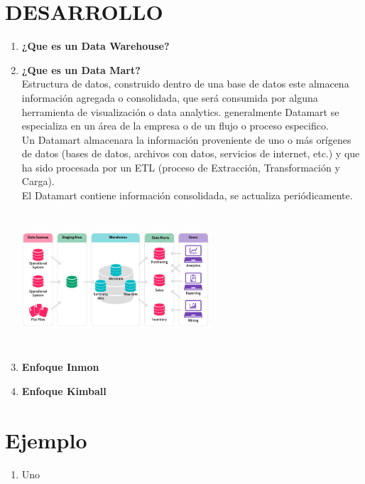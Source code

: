 \documentclass[twoside,twocolumn]{article}
\begin{document}
\section{DESARROLLO}
\begin{enumerate}
 \item \textbf{¿Que es un Data Warehouse?}

 \item \textbf{¿Que es un Data Mart?} \\
Estructura de datos, construido dentro de una base de datos este almacena información agregada o consolidada, que será consumida por alguna herramienta de visualización o data analytics. generalmente Datamart se especializa en un área de la empresa o de un flujo o proceso especifico. \\

Un Datamart almacenara la información proveniente de uno o más orígenes de datos (bases de datos, archivos con datos, servicios de internet, etc.) y que ha sido procesada por un ETL (proceso de Extracción, Transformación y Carga).\\

El Datamart contiene información consolidada, se actualiza periódicamente.

\includegraphics[width=7cm, height=5cm]{Imagenes/datawarehouse_datamart}

 \item \textbf{Enfoque Inmon}

 \item \textbf{Enfoque Kimball}
   
\end{enumerate}



\section{Ejemplo}
\begin{enumerate}

 \item Uno
   
\end{enumerate}
\end{document}

